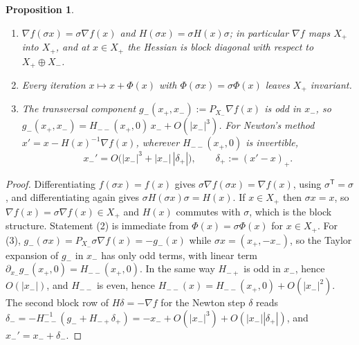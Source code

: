 \documentclass[11pt]{amsart}
\newtheorem{proposition}[theorem]{Proposition}
\theoremstyle{definition}
\begin{document}
\begin{proposition}\label{prop:strata}
\begin{enumerate}
\item $\nabla f(\sigma x)=\sigma\nabla f(x)$ and $H(\sigma x)=\sigma H(x)\sigma$; in particular $\nabla f$ maps $X_+$ into $X_+$, and at $x\in X_+$ the Hessian is block diagonal with respect to $X_+\oplus X_-$.
\item Every iteration $x\mapsto x+\Phi(x)$ with $\Phi(\sigma x)=\sigma\Phi(x)$ leaves $X_+$ invariant.
\item The transversal component $g_-(x_+,x_-):=P_{X_-}\nabla f(x)$ is odd in $x_-$, so $g_-(x_+,x_-)=H_{--}(x_+,0)\,x_-+O(|x_-|^3)$. For Newton's method $x'=x-H(x)^{-1}\nabla f(x)$, wherever $H_{--}(x_+,0)$ is invertible,
\[
x_-'=O\big(|x_-|^3+|x_-|\,|\delta_+|\big),\qquad \delta_+:=(x'-x)_+ .
\]
\end{enumerate}
\end{proposition}

\begin{proof}
Differentiating $f(\sigma x)=f(x)$ gives $\sigma\nabla f(\sigma x)=\nabla f(x)$, using $\sigma^{\mathsf T}=\sigma$, and differentiating again gives $\sigma H(\sigma x)\sigma=H(x)$. If $x\in X_+$ then $\sigma x=x$, so $\nabla f(x)=\sigma\nabla f(x)\in X_+$ and $H(x)$ commutes with $\sigma$, which is the block structure. Statement (2) is immediate from $\Phi(x)=\sigma\Phi(x)$ for $x\in X_+$. For (3), $g_-(\sigma x)=P_{X_-}\sigma\nabla f(x)=-g_-(x)$ while $\sigma x=(x_+,-x_-)$, so the Taylor expansion of $g_-$ in $x_-$ has only odd terms, with linear term $\partial_{x_-}g_-(x_+,0)=H_{--}(x_+,0)$. In the same way $H_{-+}$ is odd in $x_-$, hence $O(|x_-|)$, and $H_{--}$ is even, hence $H_{--}(x)=H_{--}(x_+,0)+O(|x_-|^2)$. The second block row of $H\delta=-\nabla f$ for the Newton step $\delta$ reads $\delta_-=-H_{--}^{-1}(g_-+H_{-+}\delta_+)=-x_-+O(|x_-|^3)+O(|x_-||\delta_+|)$, and $x_-'=x_-+\delta_-$.
\end{proof}
\end{document}
